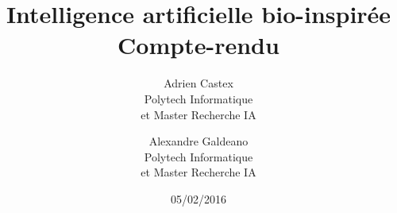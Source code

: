 \documentclass[a4paper,11pt]{article}
\begin{document}
	
\title{Intelligence artificielle bio-inspirée \\ Compte-rendu}
\author{Adrien Castex\\Polytech Informatique\\et Master Recherche IA \and Alexandre Galdeano\\Polytech Informatique\\et Master Recherche IA}
\date{05/02/2016}
\maketitle

\begin{abstract}

\end{abstract}

\tableofcontents

\clearpage

\begin{multicols}{2}
	
	
	
\end{multicols}
\end{document}
